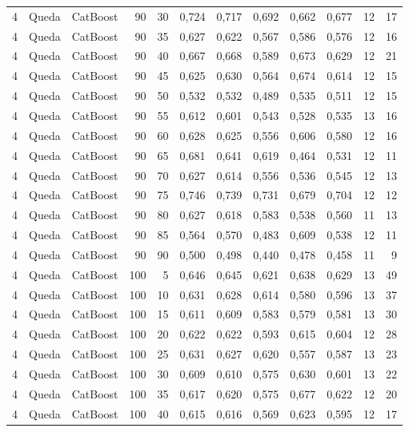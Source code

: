 \begin{longtable}{@{}rllrrrrrrrrr@{}}
4 & Queda & CatBoost & 90 & 30 & 0,724 & 0,717 & 0,692 & 0,662 & 0,677 & 12 & 17 \\
4 & Queda & CatBoost & 90 & 35 & 0,627 & 0,622 & 0,567 & 0,586 & 0,576 & 12 & 16 \\
4 & Queda & CatBoost & 90 & 40 & 0,667 & 0,668 & 0,589 & 0,673 & 0,629 & 12 & 21 \\
4 & Queda & CatBoost & 90 & 45 & 0,625 & 0,630 & 0,564 & 0,674 & 0,614 & 12 & 15 \\
4 & Queda & CatBoost & 90 & 50 & 0,532 & 0,532 & 0,489 & 0,535 & 0,511 & 12 & 15 \\
4 & Queda & CatBoost & 90 & 55 & 0,612 & 0,601 & 0,543 & 0,528 & 0,535 & 13 & 16 \\
4 & Queda & CatBoost & 90 & 60 & 0,628 & 0,625 & 0,556 & 0,606 & 0,580 & 12 & 16 \\
4 & Queda & CatBoost & 90 & 65 & 0,681 & 0,641 & 0,619 & 0,464 & 0,531 & 12 & 11 \\
4 & Queda & CatBoost & 90 & 70 & 0,627 & 0,614 & 0,556 & 0,536 & 0,545 & 12 & 13 \\
4 & Queda & CatBoost & 90 & 75 & 0,746 & 0,739 & 0,731 & 0,679 & 0,704 & 12 & 12 \\
4 & Queda & CatBoost & 90 & 80 & 0,627 & 0,618 & 0,583 & 0,538 & 0,560 & 11 & 13 \\
4 & Queda & CatBoost & 90 & 85 & 0,564 & 0,570 & 0,483 & 0,609 & 0,538 & 12 & 11 \\
4 & Queda & CatBoost & 90 & 90 & 0,500 & 0,498 & 0,440 & 0,478 & 0,458 & 11 & 9 \\
4 & Queda & CatBoost & 100 & 5 & 0,646 & 0,645 & 0,621 & 0,638 & 0,629 & 13 & 49 \\
4 & Queda & CatBoost & 100 & 10 & 0,631 & 0,628 & 0,614 & 0,580 & 0,596 & 13 & 37 \\
4 & Queda & CatBoost & 100 & 15 & 0,611 & 0,609 & 0,583 & 0,579 & 0,581 & 13 & 30 \\
4 & Queda & CatBoost & 100 & 20 & 0,622 & 0,622 & 0,593 & 0,615 & 0,604 & 12 & 28 \\
4 & Queda & CatBoost & 100 & 25 & 0,631 & 0,627 & 0,620 & 0,557 & 0,587 & 13 & 23 \\
4 & Queda & CatBoost & 100 & 30 & 0,609 & 0,610 & 0,575 & 0,630 & 0,601 & 13 & 22 \\
4 & Queda & CatBoost & 100 & 35 & 0,617 & 0,620 & 0,575 & 0,677 & 0,622 & 12 & 20 \\
4 & Queda & CatBoost & 100 & 40 & 0,615 & 0,616 & 0,569 & 0,623 & 0,595 & 12 & 17 \\

\end{longtable}
